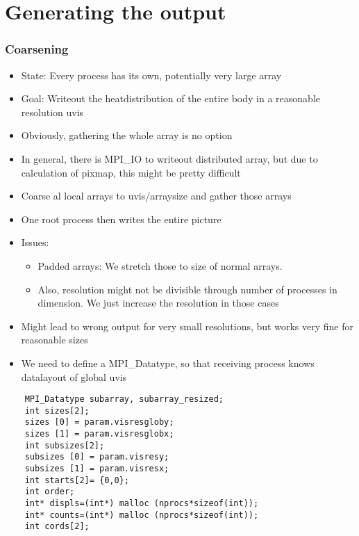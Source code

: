\section{Generating the output}
\begin{frame}
  \frametitle{Coarsening}
  \begin{itemize}
  \item State: Every process has its own, potentially very large array
  \item Goal: Writeout the heatdistribution of the entire body in a reasonable resolution uvis
  \item Obviously, gathering the whole array is no option
  \item In general, there is MPI\_IO to writeout distributed array, but due to calculation of pixmap, this might be pretty difficult
  \end{itemize}
\end{frame}

\begin{frame}
  \begin{itemize}
  \item Coarse al local arrays to uvis/arraysize and gather those arrays
  \item One root process then writes the entire picture
  \item Issues:
    \begin{itemize}
    \item Padded arrays: We stretch those to size of normal arrays.
    \item Also, resolution might not be divisible through number of processes in dimension. We just increase the resolution in those cases
    \end{itemize}
  \item Might lead to wrong output for very small resolutions, but works very fine for reasonable sizes
  \item We need to define a MPI\_Datatype, so that receiving process knows datalayout of global uvis
  \end{itemize}
\end{frame}

\begin{frame}[fragile]
  \begin{lstlisting}
    MPI_Datatype subarray, subarray_resized;
    int sizes[2];
    sizes [0] = param.visresgloby;
    sizes [1] = param.visresglobx;
    int subsizes[2];
    subsizes [0] = param.visresy;
    subsizes [1] = param.visresx;
    int starts[2]= {0,0};
    int order;
    int* displs=(int*) malloc (nprocs*sizeof(int));
    int* counts=(int*) malloc (nprocs*sizeof(int));
    int cords[2];
  \end{lstlisting}
\end{frame}



